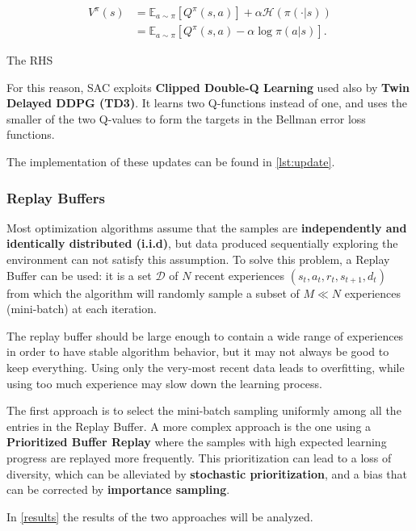 \documentclass[a4paper, 11pt]{article}
\begin{document}
	
	\begin{align}
	V^{\pi}(s) &= \mathbb{E}_{a \sim \pi}[Q^{\pi}(s,a)] + \alpha \mathcal{H} \left(\pi(\cdot|s)\right) \\ &= \mathbb{E}_{a \sim \pi}[Q^{\pi}(s,a) - \alpha \log \pi(a|s)].
	\end{align}
	
	The RHS
	
	
	For this reason, SAC exploits \textbf{Clipped Double-Q Learning} used also by \textbf{Twin Delayed DDPG (TD3)}. It learns two Q-functions instead of one, and uses the smaller of the two Q-values to form the targets in the Bellman error loss functions.
	
	
	The implementation of these updates can be found in \vref{lst:update}.
	

	
	
	\subsubsection{Replay Buffers} Most optimization algorithms assume that the samples are \textbf{independently and identically distributed (i.i.d)}, but data produced sequentially exploring the environment can not satisfy this assumption. To solve this problem, a Replay Buffer can be used: it is a set $\mathcal D$ of $N$ recent experiences $(s_t, a_t, r_t, s_{t+1}, d_t)$ from which the algorithm will randomly sample a subset of $M\ll N$ experiences (mini-batch) at each iteration.
	
	The replay buffer should be large enough to contain a wide range of experiences in order to have stable algorithm behavior, but it may not always be good to keep everything. Using only the very-most recent data leads to overfitting, while using too much experience may slow down the learning process.
	
	The first approach is to select the mini-batch sampling uniformly among all the entries in the Replay Buffer.
	A more complex approach is the one using a \textbf{Prioritized Buffer Replay} \cite{schaul2015prioritized} where the samples with high expected learning progress are replayed more frequently. This prioritization can lead to a loss of diversity, which can be alleviated by \textbf{stochastic prioritization}, and a bias that can be corrected by \textbf{importance sampling}.
	
	In \vref{results} the results of the two approaches will be analyzed.
	
\end{document}
